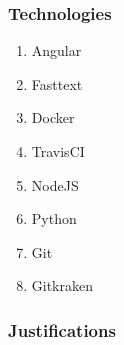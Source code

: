 \documentclass[11pt]{article}
\begin{document}
\subsubsection{Technologies}
\begin{enumerate}
	\item Angular
	\item Fasttext
	\item Docker
	\item TravisCI
	\item NodeJS
	\item Python
	\item Git
	\item Gitkraken
\end{enumerate}
\subsubsection{Justifications}
\end{document}
